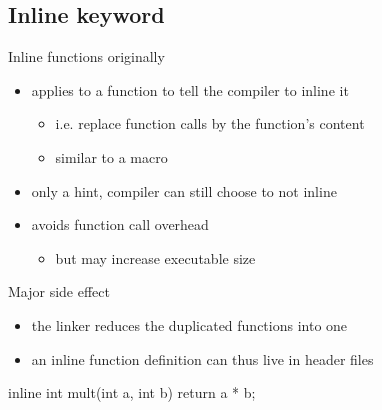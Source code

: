 \subsection[inline]{Inline keyword}

\begin{frame}[fragile]
  \begin{block}{Inline functions originally}
    \begin{itemize}
      \item applies to a function to tell the compiler to inline it
        \begin{itemize}
        \item i.e. replace function calls by the function's content
        \item similar to a macro
        \end{itemize}
      \item only a hint, compiler can still choose to not inline
      \item avoids function call overhead
        \begin{itemize}
        \item but may increase executable size
        \end{itemize}
    \end{itemize}
  \end{block}
  \begin{exampleblock}{Major side effect}
    \begin{itemize}
      \item the linker reduces the duplicated functions into one
      \item an inline function definition can thus live in header files
    \end{itemize}
  \end{exampleblock}
  \begin{block}{}
    \begin{cppcode*}{}
      inline int mult(int a, int b) {
        return a * b;
      }
    \end{cppcode*}
  \end{block}
\end{frame}

